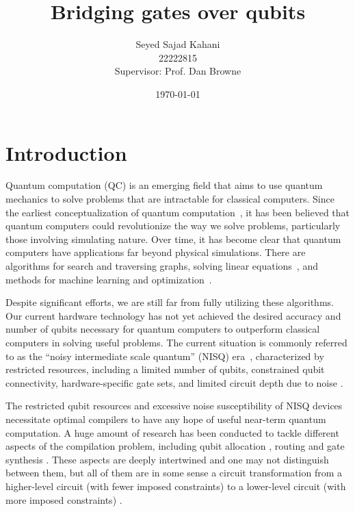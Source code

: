 \documentclass{report}
\title{Bridging gates over qubits}
\author{Seyed Sajad Kahani \\ 22222815 \\Supervisor: Prof. Dan Browne}
\date{\today}
\begin{document}
\maketitle

\tableofcontents

\begin{abstract}
  
\end{abstract}

\chapter{Introduction}

Quantum computation (QC) is an emerging field that aims to use quantum mechanics to solve problems that are intractable for classical computers. Since the earliest conceptualization of quantum computation~\cite{feynman1986}, it has been believed that quantum computers could revolutionize the way we solve problems, particularly those involving simulating nature. Over time, it has become clear that quantum computers have applications far beyond physical simulations. There are algorithms for search and traversing graphs, solving linear equations~\cite{montanaro2016}, and methods for machine learning and optimization~\cite{jordan2023}.

Despite significant efforts, we are still far from fully utilizing these algorithms. Our current hardware technology has not yet achieved the desired accuracy and number of qubits necessary for quantum computers to outperform classical computers in solving useful problems. The current situation is commonly referred to as the ``noisy intermediate scale quantum'' (NISQ) era~\cite{preskill2018}, characterized by restricted resources, including a limited number of qubits, constrained qubit connectivity, hardware-specific gate sets, and limited circuit depth due to noise \cite{cross2019}.

The restricted qubit resources and excessive noise susceptibility of NISQ devices necessitate optimal compilers to have any hope of useful near-term quantum computation. A huge amount of research has been conducted to tackle different aspects of the compilation problem, including qubit allocation \cite{itoko2019,siraichi2018,paler2019,zhang2021,li2019}, routing \cite{childs,zhou2020,itoko2019,cowtan2019,nash2020,kissinger2019} and gate synthesis \cite{shende2006,vatan2004,tucci2005,vatan2004a,shende2004,khaneja2001}. These aspects are deeply intertwined and one may not distinguish between them, but all of them are in some sense a circuit transformation from a higher-level circuit (with fewer imposed constraints) to a lower-level circuit (with more imposed constraints) \cite{hundt2022}.
\end{document}
